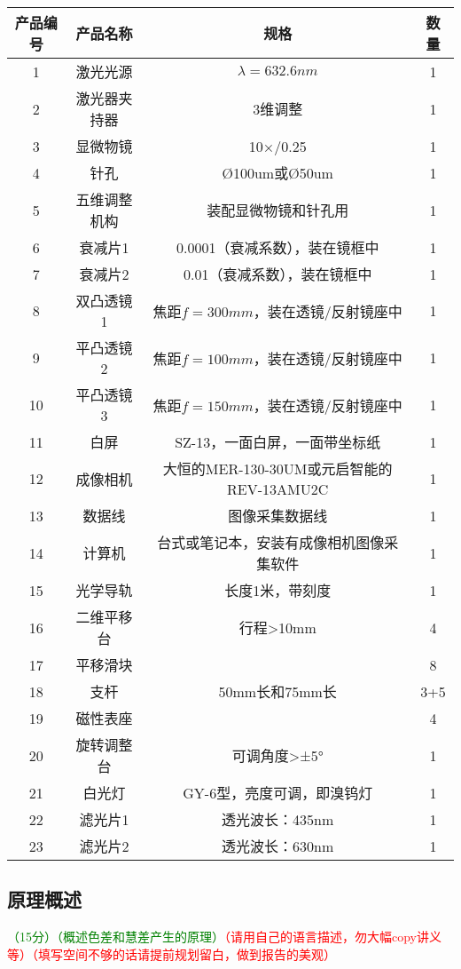 \documentclass[dvipsnames, svgnames,a4paper,11pt]{article}
\begin{document}
\begin{table}[htbp]
    \centering
    \begin{tabular}{|c|c|c|c|}
        \hline
        产品编号 & 产品名称 & 规格 & 数量 \\
        \hline
        1 & 激光光源 & $\lambda =632.6nm$ & 1 \\
        2 & 激光器夹持器 & 3维调整 & 1 \\
        3 & 显微物镜 & 10×/0.25 & 1 \\
        4 & 针孔 & Ø100um或Ø50um & 1 \\
        5 & 五维调整机构 & 装配显微物镜和针孔用 & 1 \\
        6 & 衰减片1 & 0.0001（衰减系数），装在镜框中 & 1 \\
        7 & 衰减片2 & 0.01（衰减系数），装在镜框中 & 1 \\
        8 & 双凸透镜1 & 焦距$f=300mm$，装在透镜/反射镜座中 & 1 \\
        9 & 平凸透镜2 & 焦距$f=100mm$，装在透镜/反射镜座中 & 1 \\
        10 & 平凸透镜3 & 焦距$f=150mm$，装在透镜/反射镜座中 & 1 \\
        11 & 白屏 & SZ-13，一面白屏，一面带坐标纸 & 1 \\
        12 & 成像相机 & 大恒的MER-130-30UM或元启智能的REV-13AMU2C & 1 \\
        13 & 数据线 & 图像采集数据线 & 1 \\
        14 & 计算机 & 台式或笔记本，安装有成像相机图像采集软件 & 1 \\
        15 & 光学导轨 & 长度1米，带刻度 & 1 \\
        16 & 二维平移台 & 行程>10mm & 4 \\
        17 & 平移滑块 & & 8 \\
        18 & 支杆 & 50mm长和75mm长 & 3+5 \\
        19 & 磁性表座 & & 4 \\
        20 & 旋转调整台 & 可调角度>±5° & 1 \\
        21 & 白光灯 & GY-6型，亮度可调，即溴钨灯 & 1 \\
        22 & 滤光片1 & 透光波长：435nm & 1 \\
        23 & 滤光片2 & 透光波长：630nm & 1 \\
        \hline
    \end{tabular}
\end{table}



\subsection{原理概述}
\textcolor{green}{（15分）（概述色差和慧差产生的原理）}\textcolor{red}{（请用自己的语言描述，勿大幅copy讲义等）（填写空间不够的话请提前规划留白，做到报告的美观）}
\end{document}
